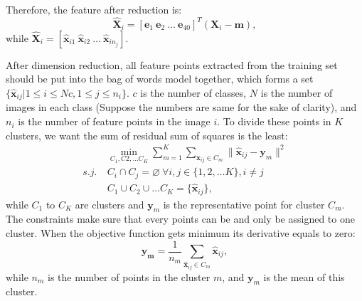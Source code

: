 \documentclass[conference]{IEEEtran}
\begin{document}
Therefore, the feature after reduction is:
\begin{equation}
	\hat{\mathbf{X}}_i = [\mathbf{e}_1\ \mathbf{e}_2\ \dots\ \mathbf{e}_{40}]^T (\mathbf{X}_i-\mathbf{m}),
\end{equation}
while $\hat{\mathbf{X}}_i = [\hat{\mathbf{x}}_{i1}\ \hat{\mathbf{x}}_{i2}\ \dots \ \hat{\mathbf{x}}_{in_j}]$.

After dimension reduction, all feature points extracted from the training set should be put into the bag of words model together, which forms a set $\{\hat{\mathbf{x}}_{ij}|1\leq i \leq Nc, 1\leq j \leq n_i\}$. $c$ is the number of classes, $N$ is the number of images in each class (Suppose the numbers are same for the sake of clarity), and $n_i$ is the number of feature points in the image $i$. To divide these points in $K$ clusters, we want the sum of residual sum of squares is the least:
\begin{align}
	&\min_{C_1,C2,\dots C_K}\sum\limits_{m=1}^{K} \sum\limits_{\hat{\mathbf{x}}_{ij}\in C_m} \|\hat{\mathbf{x}}_{ij} - \mathbf{y}_m  \|^2\\
	s.j.\ &C_i\cap C_j = \varnothing\ \forall i,j \in \{1,2,\dots K\}, i \not= j\\
	&C_1\cup C_2 \cup \dots C_K = \{\hat{\mathbf{x}}_{ij}\},
\end{align}
while $C_1$ to $C_K$ are clusters and $\mathbf{y}_m$ is the representative point for cluster $C_m$. The constraints make sure that every points can be and only be assigned to one cluster. When the objective function gets minimum its derivative equals to zero:
\begin{equation}
	\mathbf{y_m} = \frac{1}{n_m} \sum\limits_{\hat{\mathbf{x}}_{ij}\in C_m} \hat{\mathbf{x}}_{ij},
\end{equation}
while $n_m$ is the number of points in the cluster $m$, and $\mathbf{y}_m$ is the mean of this cluster.
\end{document}
